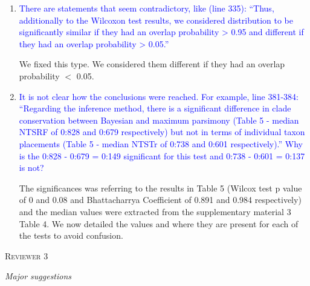 \documentclass[12pt,letterpaper]{article}
\renewcommand{\section}[1]{%
\bigskip
\begin{center}
\begin{Large}
\normalfont\scshape #1
\medskip
\end{Large}
\end{center}}
\renewcommand{\subsection}[1]{%
\bigskip
\begin{center}
\begin{large}
\normalfont\itshape #1
\end{large}
\end{center}}
\begin{document}
\begin{enumerate}

\item{\textcolor{blue}{There are statements that seem contradictory, like (line 335): ``Thus, additionally to the Wilcoxon test results, we considered distribution to be significantly similar if they had an overlap probability > 0.95 and different if they had an overlap probability > 0.05.''}}

We fixed this type. We considered them different if they had an overlap probability $<$ 0.05.

\item{\textcolor{blue}{It is not clear how the conclusions were reached. For example, line 381-384: ``Regarding the inference method, there is a significant difference in clade conservation between Bayesian and maximum parsimony (Table 5 - median NTSRF of 0:828 and 0:679 respectively) but not in terms of individual taxon placements (Table 5 - median NTSTr of 0:738 and 0:601 respectively).'' Why is the 0:828 - 0:679 = 0:149 significant for this test and 0:738 - 0:601 = 0:137 is not?}}

The significances was referring to the results in Table 5 (Wilcox test p value of 0 and 0.08 and Bhattacharrya Coefficient of 0.891 and 0.984 respectively) and the median values were extracted from the supplementary material 3 Table 4.
We now detailed the values and where they are present for each of the tests to avoid confusion.

\end{enumerate}





%
%





\section{Reviewer 3}

\subsection{Major suggestions}
\end{document}
